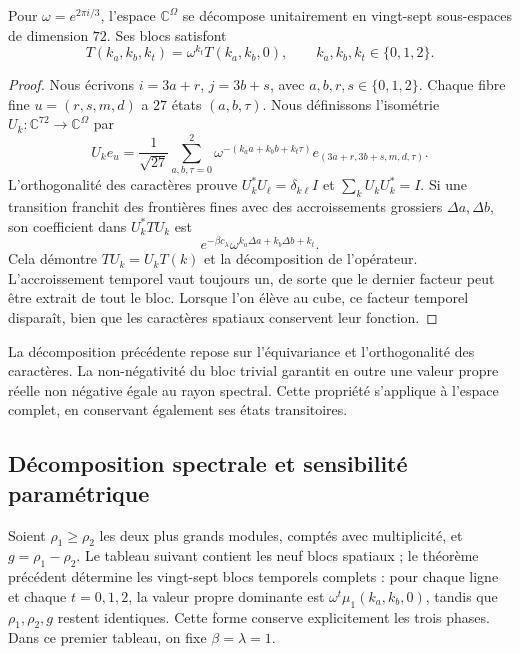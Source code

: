 \begin{theorem}
\label{iii:hist:descomposicion}
Pour $\omega=e^{2\pi i/3}$, l’espace $\mathbb C^\Omega$ se décompose
unitairement en vingt-sept sous-espaces de dimension $72$. Ses blocs
satisfont
\[
 T(k_a,k_b,k_t)=\omega^{k_t}T(k_a,k_b,0),
 \qquad k_a,k_b,k_t\in\{0,1,2\}.
\]
\end{theorem}
\begin{proof}
Nous écrivons $i=3a+r$, $j=3b+s$, avec $a,b,r,s\in\{0,1,2\}$.
Chaque fibre fine $u=(r,s,m,d)$ a $27$ états $(a,b,\tau)$.
Nous définissons l’isométrie $U_k:\mathbb C^{72}\to\mathbb C^\Omega$ par
\[
 U_ke_u=\frac1{\sqrt{27}}
 \sum_{a,b,\tau=0}^2
 \omega^{-(k_aa+k_bb+k_t\tau)}e_{(3a+r,3b+s,m,d,\tau)}.
\]
L’orthogonalité des caractères prouve $U_k^*U_\ell=\delta_{k\ell}I$ et
$\sum_kU_kU_k^*=I$. Si une transition franchit des frontières fines avec des accroissements
grossiers $\Delta a,\Delta b$, son coefficient dans $U_k^*TU_k$ est
\[
 e^{-\beta c_\lambda}\omega^{k_a\Delta a+k_b\Delta b+k_t}.
\]
Cela démontre $TU_k=U_kT(k)$ et la décomposition de l’opérateur. L’accroissement
temporel vaut toujours un, de sorte que le dernier facteur peut être extrait de
tout le bloc. Lorsque l’on élève au cube, ce facteur temporel disparaît, bien que
les caractères spatiaux conservent leur fonction.
\end{proof}

La décomposition précédente repose sur l’équivariance et l’orthogonalité
des caractères. La non-négativité du bloc trivial garantit en outre une
valeur propre réelle non négative égale au rayon spectral. Cette propriété
s’applique à l’espace complet, en conservant également ses états transitoires.

\subsection{Décomposition spectrale et sensibilité paramétrique}
\label{iii:hist:espectros}

Soient $\rho_1\geq\rho_2$ les deux plus grands modules, comptés avec
multiplicité, et $g=\rho_1-\rho_2$. Le tableau suivant contient les
neuf blocs spatiaux ; le théorème précédent détermine les vingt-sept
blocs temporels complets : pour chaque ligne et chaque $t=0,1,2$, la valeur propre
dominante est $\omega^t\mu_1(k_a,k_b,0)$, tandis que $\rho_1,\rho_2,g$
restent identiques. Cette forme conserve explicitement les trois phases.
Dans ce premier tableau, on fixe $\beta=\lambda=1$.

